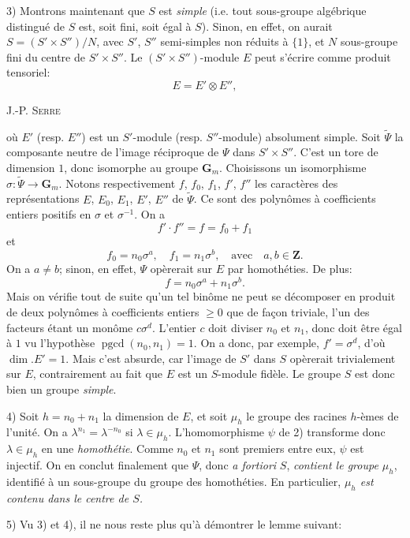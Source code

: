 3) Montrons maintenant que $S$ est \textit{simple} (i.e. tout sous-groupe algébrique distingué de $S$ est, soit fini, soit égal à $S$). Sinon, en effet, on aurait $S=(S'\times S'')/N$, avec $S'$, $S''$ semi-simples non réduits à $\{1\}$, et $N$ sous-groupe fini du centre de $S'\times S''$. Le $(S'\times S'')$-module $E$ peut s’écrire comme produit tensoriel:
\[
E=E'\otimes E'',
\]
\begin{center}\small J.-P. \textsc{Serre}\end{center}
où $E'$ (resp. $E''$) est un $S'$-module (resp. $S''$-module) absolument simple. Soit $\widetilde{\varPsi}$ la composante neutre de l’image réciproque de $\varPsi$ dans $S'\times S''$. C’est un tore de dimension $1$, donc isomorphe au groupe $\mathbf{G}_m$. Choisissons un isomorphisme $\sigma:\widetilde{\varPsi}\to\mathbf{G}_m$. Notons respectivement $f$, $f_0$, $f_1$, $f'$, $f''$ les caractères des représentations $E$, $E_0$, $E_1$, $E'$, $E''$ de $\widetilde{\varPsi}$. Ce sont des polynômes à coefficients entiers positifs en $\sigma$ et $\sigma^{-1}$. On a
\[
f'\cdot f''=f=f_0+f_1
\]
et
\[
f_0=n_0\sigma^a,\quad f_1=n_1\sigma^b,\quad\text{avec}\quad a,b\in\mathbf{Z}.
\]
On a $a\ne b$; sinon, en effet, $\varPsi$ opèrerait sur $E$ par homothéties. De plus:
\[
f=n_0\sigma^a+n_1\sigma^b.
\]
Mais on vérifie tout de suite qu’un tel binôme ne peut se décomposer en produit de deux polynômes à coefficients entiers $\geqslant 0$ que de façon triviale, l’un des facteurs étant un monôme $c\sigma^d$. L’entier $c$ doit diviser $n_0$ et $n_1$, donc doit être égal à $1$ vu l’hypothèse $\operatorname{pgcd}(n_0,n_1)=1$. On a donc, par exemple, $f'=\sigma^d$, d’où $\dim. E'=1$. Mais c’est absurde, car l’image de $S'$ dans $S$ opèrerait trivialement sur $E$, contrairement au fait que $E$ est un $S$-module fidèle. Le groupe $S$ est donc bien un groupe \textit{simple}.

4) Soit $h=n_0+n_1$ la dimension de $E$, et soit $\mu_h$ le groupe des racines $h$-èmes de l’unité. On a $\lambda^{n_1}=\lambda^{-n_0}$ si $\lambda\in\mu_h$. L’homomorphisme $\psi$ de 2) transforme donc $\lambda\in\mu_h$ en une \textit{homothétie}. Comme $n_0$ et $n_1$ sont premiers entre eux, $\psi$ est injectif. On en conclut finalement que $\varPsi$, donc \textit{a fortiori} $S$, \textit{contient le groupe $\mu_h$}, identifié à un sous-groupe du groupe des homothéties. En particulier, \textit{$\mu_h$ est contenu dans le centre de $S$.}

5) Vu 3) et 4), il ne nous reste plus qu’à démontrer le lemme suivant:

